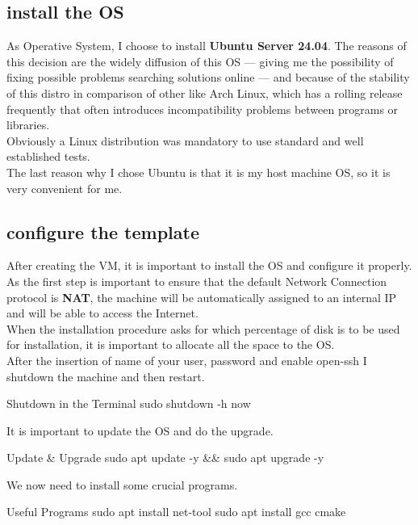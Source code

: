 \subsection{install the OS}

As Operative System, I choose to install \textbf{Ubuntu Server 24.04}. The reasons of this decision are the widely diffusion of this OS --- giving me the possibility of fixing possible problems searching solutions online --- and because of the stability of this distro in comparison of other like Arch Linux, which has a rolling release frequently that often introduces incompatibility problems between programs or libraries. \\
Obviously a Linux distribution was mandatory to use standard and well established tests. \\
The last reason why I chose Ubuntu is that it is my host machine OS, so it is very convenient for me.

\subsection{configure the template}

After creating the VM, it is important to install the OS and configure it properly. \\
As the first step is important to ensure that the default Network Connection protocol is \textbf{NAT}, the machine will be automatically assigned to an internal IP and will be able to access the Internet. \\
When the installation procedure asks for which percentage of disk is to be used for installation, it is important to allocate all the space to the OS. \\
After the insertion of name of your user, password and enable open-ssh I shutdown the machine and then restart.

\begin{codice}[style=bashstyle]{Shutdown in the Terminal}
    sudo shutdown -h now
\end{codice}

It is important to update the OS and do the upgrade.

\begin{codice}[style=bashstyle]{Update \& Upgrade}
    sudo apt update -y && sudo apt upgrade -y
\end{codice}

We now need to install some crucial programs.

\begin{codice}[style=bashstyle]{Useful Programs}
    sudo apt install net-tool
    sudo apt install gcc cmake
\end{codice}

